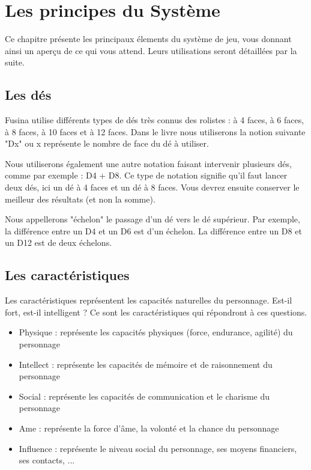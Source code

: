 \documentclass{conf/FusinaClass}
\begin{document}
\chapter{Les principes du Système}
Ce chapitre présente les principaux élements du système de jeu, vous donnant ainsi un aperçu de ce qui vous attend. Leurs utilisations seront détaillées par la suite.

\section{Les dés}
Fusina utilise différents types de dés très connus des rolistes : à 4 faces, à 6 faces, à 8 faces, à 10 faces et à 12 faces. Dans le livre nous utiliserons la notion suivante "Dx" ou x représente le nombre de face du dé à utiliser. 

Nous utiliserons également une autre notation faisant intervenir plusieurs dés, comme par exemple : D4 + D8. Ce type de notation signifie qu'il faut lancer deux dés, ici un dé à 4 faces et un dé à 8 faces. Vous devrez ensuite conserver le meilleur des résultats (et non la somme).

Nous appellerons "échelon" le passage d'un dé vers le dé supérieur. Par exemple, la différence entre un D4 et un D6 est d'un échelon. La différence entre un D8 et un D12 est de deux échelons.

\section{Les caractéristiques}
Les caractéristiques représentent les capacités naturelles du personnage. Est-il fort, est-il intelligent ? Ce sont les caractéristiques qui répondront à ces questions.

\begin{itemize}
\item Physique : représente les capacités physiques (force, endurance, agilité) du personnage
\item Intellect : représente les capacités de mémoire et de raisonnement du personnage
\item Social : représente les capacités de communication et le charisme du personnage
\item Ame : représente la force d'âme, la volonté et la chance du personnage
\item Influence : représente le niveau social du personnage, ses moyens financiers, ses contacts, ...
\end{itemize}
\end{document}
